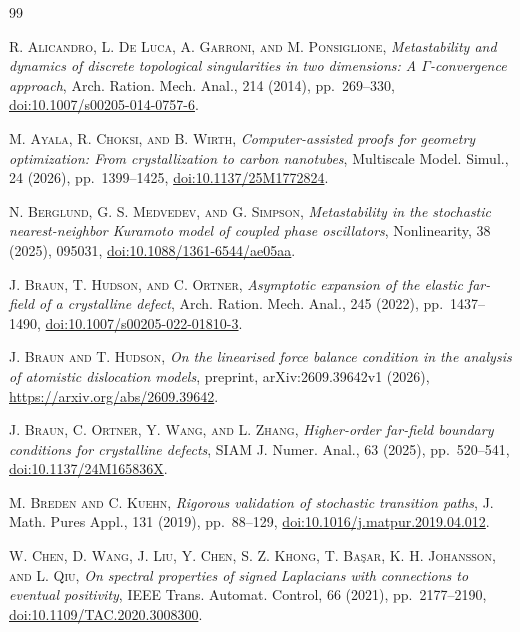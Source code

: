 \begin{thebibliography}{99}
\raggedright
{}
\textsc{R. Alicandro, L. De Luca, A. Garroni, and M. Ponsiglione},
\emph{Metastability and dynamics of discrete topological singularities in two dimensions: A $\Gamma$-convergence approach}, Arch. Ration. Mech. Anal., 214 (2014), pp.~269--330,
\href{https://doi.org/10.1007/s00205-014-0757-6}{doi:10.1007/s00205-014-0757-6}.

\textsc{M. Ayala, R. Choksi, and B. Wirth},
\emph{Computer-assisted proofs for geometry optimization: From crystallization to carbon nanotubes}, Multiscale Model. Simul., 24 (2026), pp.~1399--1425,
\href{https://doi.org/10.1137/25M1772824}{doi:10.1137/25M1772824}.

\textsc{N. Berglund, G. S. Medvedev, and G. Simpson},
\emph{Metastability in the stochastic nearest-neighbor Kuramoto model of coupled phase oscillators}, Nonlinearity, 38 (2025), 095031,
\href{https://doi.org/10.1088/1361-6544/ae05aa}{doi:10.1088/1361-6544/ae05aa}.

\textsc{J. Braun, T. Hudson, and C. Ortner},
\emph{Asymptotic expansion of the elastic far-field of a crystalline defect}, Arch. Ration. Mech. Anal., 245 (2022), pp.~1437--1490,
\href{https://doi.org/10.1007/s00205-022-01810-3}{doi:10.1007/s00205-022-01810-3}.

\textsc{J. Braun and T. Hudson},
\emph{On the linearised force balance condition in the analysis of atomistic dislocation models}, preprint, arXiv:2609.39642v1 (2026),
\url{https://arxiv.org/abs/2609.39642}.

\textsc{J. Braun, C. Ortner, Y. Wang, and L. Zhang},
\emph{Higher-order far-field boundary conditions for crystalline defects}, SIAM J. Numer. Anal., 63 (2025), pp.~520--541,
\href{https://doi.org/10.1137/24M165836X}{doi:10.1137/24M165836X}.

\textsc{M. Breden and C. Kuehn},
\emph{Rigorous validation of stochastic transition paths}, J. Math. Pures Appl., 131 (2019), pp.~88--129,
\href{https://doi.org/10.1016/j.matpur.2019.04.012}{doi:10.1016/j.matpur.2019.04.012}.

\textsc{W. Chen, D. Wang, J. Liu, Y. Chen, S. Z. Khong, T. Ba\c{s}ar, K. H. Johansson, and L. Qiu},
\emph{On spectral properties of signed Laplacians with connections to eventual positivity}, IEEE Trans. Automat. Control, 66 (2021), pp.~2177--2190,
\href{https://doi.org/10.1109/TAC.2020.3008300}{doi:10.1109/TAC.2020.3008300}.


\end{thebibliography}
